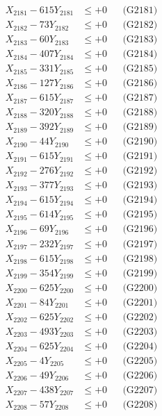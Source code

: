 \documentclass[a4paper,10pt]{article}
\begin{document}
{\begin{align}
\allowbreak
X_{2181} - 615Y_{2181} &\leq +0 && \text{(G2181)} \\
X_{2182} - 73Y_{2182} &\leq +0 && \text{(G2182)} \\
X_{2183} - 60Y_{2183} &\leq +0 && \text{(G2183)} \\
X_{2184} - 407Y_{2184} &\leq +0 && \text{(G2184)} \\
X_{2185} - 331Y_{2185} &\leq +0 && \text{(G2185)} \\
X_{2186} - 127Y_{2186} &\leq +0 && \text{(G2186)} \\
X_{2187} - 615Y_{2187} &\leq +0 && \text{(G2187)} \\
X_{2188} - 320Y_{2188} &\leq +0 && \text{(G2188)} \\
X_{2189} - 392Y_{2189} &\leq +0 && \text{(G2189)} \\
X_{2190} - 44Y_{2190} &\leq +0 && \text{(G2190)} \\
\allowbreak
X_{2191} - 615Y_{2191} &\leq +0 && \text{(G2191)} \\
X_{2192} - 276Y_{2192} &\leq +0 && \text{(G2192)} \\
X_{2193} - 377Y_{2193} &\leq +0 && \text{(G2193)} \\
X_{2194} - 615Y_{2194} &\leq +0 && \text{(G2194)} \\
X_{2195} - 614Y_{2195} &\leq +0 && \text{(G2195)} \\
X_{2196} - 69Y_{2196} &\leq +0 && \text{(G2196)} \\
X_{2197} - 232Y_{2197} &\leq +0 && \text{(G2197)} \\
X_{2198} - 615Y_{2198} &\leq +0 && \text{(G2198)} \\
X_{2199} - 354Y_{2199} &\leq +0 && \text{(G2199)} \\
X_{2200} - 625Y_{2200} &\leq +0 && \text{(G2200)} \\
\allowbreak
X_{2201} - 84Y_{2201} &\leq +0 && \text{(G2201)} \\
X_{2202} - 625Y_{2202} &\leq +0 && \text{(G2202)} \\
X_{2203} - 493Y_{2203} &\leq +0 && \text{(G2203)} \\
X_{2204} - 625Y_{2204} &\leq +0 && \text{(G2204)} \\
X_{2205} - 4Y_{2205} &\leq +0 && \text{(G2205)} \\
X_{2206} - 49Y_{2206} &\leq +0 && \text{(G2206)} \\
X_{2207} - 438Y_{2207} &\leq +0 && \text{(G2207)} \\
X_{2208} - 57Y_{2208} &\leq +0 && \text{(G2208)} \\

\end{align}}
\end{document}
